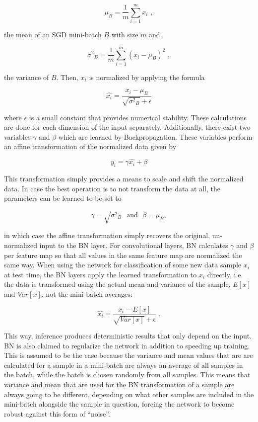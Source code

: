 \[ \mu_B = \frac{1}{m} \sum \limits_{i=1}^{m} x_i\,\, , \]

\noindent the mean of an SGD mini-batch $B$ with size $m$ and

\[ {\sigma^2}_B = \frac{1}{m} \sum \limits_{i=1}^{m} \left ( x_i - \mu_B \right )^2 \,\, , \]

\noindent the variance of $B$. Then, $x_i$ is normalized by applying the formula

\[  \hat{x_i} = \frac{x_i - \mu_B}{\sqrt{{\sigma^2}_B} + \epsilon} \]

\noindent where $\epsilon$ is a small constant that provides numerical stability. These calculations are done for each dimension of the input separately. Additionally, there exist two variables $\gamma$ and $\beta$ which are learned by Backpropagation. These variables perform an affine transformation of the normalized data given by

\[ y_i = \gamma \hat{x_i} + \beta \]

\noindent This transformation simply provides a means to scale and shift the normalized data. In case the best operation is to not transform the data at all, the parameters can be learned to be set to 

\[ \gamma = \sqrt{{\sigma^2}_B} \,\,\text{ and } \,\, \beta = \mu_B ,\]

\noindent in which case the affine transformation simply recovers the original, un-normalized input to the BN layer. For convolutional layers, BN calculates $\gamma$ and $\beta$ per feature map so that all values in the same feature map are normalized the same way. When using the network for classification of some new data sample $x_i$ at test time, the BN layers apply the learned transformation to $x_i$ directly, i.e. the data is transformed using the actual mean and variance of the sample, $E[x]$ and $Var[x]$, not the mini-batch averages:

\[  \hat{x_i} = \frac{x_i - E[x]}{\sqrt{Var[x]} + \epsilon}\,\,  . \]

\noindent This way, inference produces deterministic results that only depend on the input.\\

\noindent BN is also claimed to regularize the network in addition to speeding up training. This is assumed to be the case because the variance and mean values that are are calculated for a sample in a mini-batch are always an average of all samples in the batch, while the batch is chosen randomly from all samples. This means that variance and mean that are used for the BN transformation of a sample are always going to be different, depending on what other samples are included in the mini-batch alongside the sample in question, forcing the network to become robust against this form of ``noise''.


